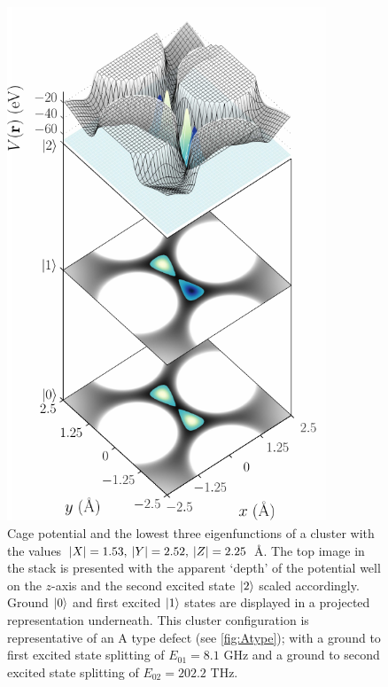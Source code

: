 \begin{figure}[p]
\includegraphics[width=0.85\textwidth]{figures/wfstackA}
\caption[A Type Energy States]{\label{fig:wfstackA}Cage potential and the lowest three eigenfunctions of a cluster with the values $\lvert X\rvert=1.53, \: \lvert Y\rvert = 2.52, \: \lvert Z\rvert = 2.25$ \AA. The top image in the stack is presented with the apparent `depth' of the potential well on the $z$-axis and the second excited state $\lvert2\rangle$ scaled accordingly. Ground $\lvert0\rangle$ and first excited $\lvert1\rangle$ states are displayed in a projected representation underneath. This cluster configuration is representative of an A type defect (see \cref{fig:Atype}); with a ground to first excited state splitting of $E_{01} = 8.1$ GHz and a ground to second excited state splitting of $E_{02} = 202.2$ THz.}
\end{figure}

